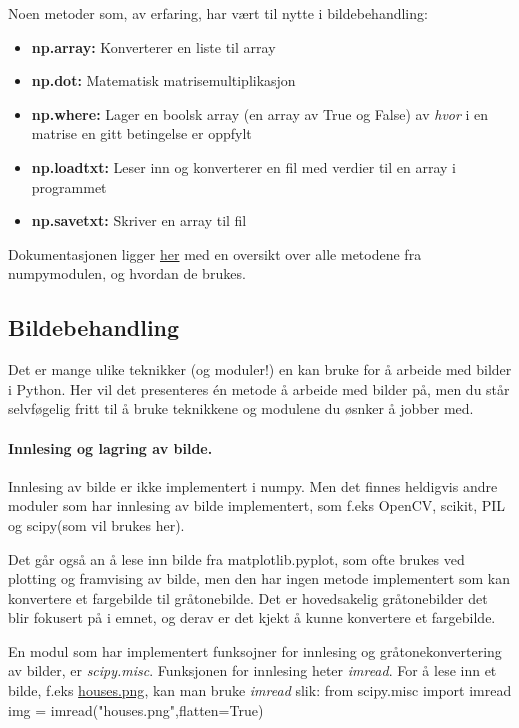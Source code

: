 \documentclass[%
oneside,                 %
final,                   %
10pt]{article}
\begin{document}
Noen metoder som, av erfaring, har vært til nytte i bildebehandling:
\begin{itemize}
\item \textbf{np.array:} Konverterer en liste til array

\item \textbf{np.dot:} Matematisk matrisemultiplikasjon

\item \textbf{np.where:} Lager en boolsk array (en array av True og False) av \emph{hvor} i en matrise en gitt betingelse er oppfylt

\item \textbf{np.loadtxt:} Leser inn og konverterer en fil med verdier til en array i programmet

\item \textbf{np.savetxt:} Skriver en array til fil
\end{itemize}

\noindent
Dokumentasjonen ligger \href{{https://docs.scipy.org/doc/numpy/reference/}}{her} med en oversikt over alle metodene fra numpymodulen, og hvordan de brukes.


\subsection{Bildebehandling}
Det er mange ulike teknikker (og moduler!) en kan bruke for å arbeide med bilder i Python. Her vil det presenteres én metode å arbeide med bilder på, men
du står selvføgelig fritt til å bruke teknikkene og modulene du øsnker å jobber med.

\paragraph{Innlesing og lagring av bilde.}
Innlesing av bilde er ikke implementert i numpy. Men det finnes heldigvis andre moduler som har innlesing av bilde implementert, som f.eks OpenCV, scikit, PIL og scipy(som vil brukes her).

Det går også an å lese inn bilde fra matplotlib.pyplot, som ofte brukes ved plotting og framvising av bilde, men den har ingen metode implementert som kan konvertere et fargebilde til gråtonebilde.
Det er hovedsakelig gråtonebilder det blir fokusert på i emnet, og derav er det kjekt å kunne konvertere et fargebilde.

En modul som har implementert funksojner for innlesing og gråtonekonvertering av bilder, er \emph{scipy.misc}.
Funksjonen for innlesing heter \emph{imread}. For å lese inn et bilde, f.eks \href{{https://github.com/krisbhei/INF2310/raw/master/Programmering/Python/houses.png}}{houses.png}, kan man bruke \emph{imread} slik:
\bpycod
from scipy.misc import imread
img = imread("houses.png",flatten=True)
\epycod
\end{document}

